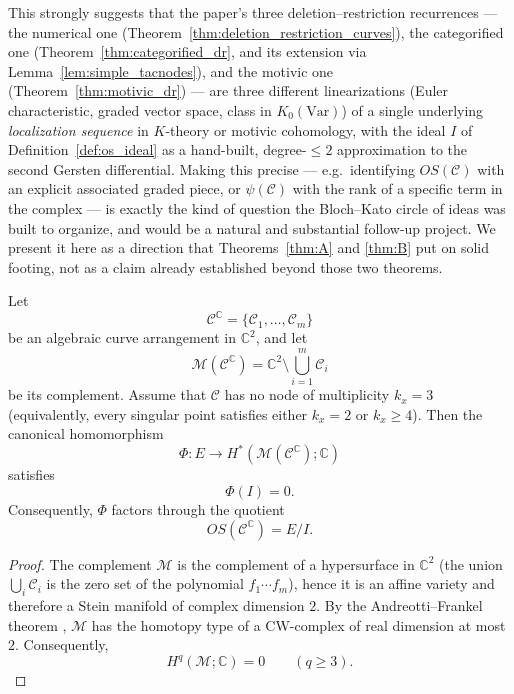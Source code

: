 \documentclass[article,11pt]{amsart} \numberwithin{equation}{section}
\numberwithin{equation}{section}
\begin{document}
{\begin{rk}
	This strongly suggests that the paper's three deletion--restriction
	recurrences --- the numerical one (Theorem~\ref{thm:deletion_restriction_curves}), the categorified one
	(Theorem~\ref{thm:categorified_dr}, and its extension via Lemma~\ref{lem:simple_tacnodes}), and the motivic one
	(Theorem~\ref{thm:motivic_dr}) --- are three different linearizations (Euler
	characteristic, graded vector space, class in $K_0(\mathrm{Var})$) of a
	single underlying \emph{localization sequence} in $K$-theory or motivic
	cohomology, with the ideal $I$ of Definition~\ref{def:os_ideal} as a hand-built,
	degree-$\le2$ approximation to the second Gersten differential. Making this
	precise --- e.g.\ identifying $OS(\mathcal C)$ with an explicit associated
	graded piece, or $\psi(\mathcal C)$ with the rank of a specific term in the
	complex --- is exactly the kind of question the Bloch--Kato circle of ideas
	was built to organize, and would be a natural and substantial follow-up
	project. We present it here as a direction that Theorems~\ref{thm:A} and
	\ref{thm:B} put on solid footing, not as a claim already established beyond
	those two theorems.
\end{rk}

\begin{thm}
	\label{thm:triple_obstruction}
	Let
	\[
	\mathcal C^{\mathbb C}
	=
	\{\mathscr C_1,\dots,\mathscr C_m\}
	\]
	be an algebraic curve arrangement in
	$\mathbb C^2$, and let
	\[
	\mathcal M(\mathcal C^{\mathbb C})
	=
	\mathbb C^2
	\setminus
	\bigcup_{i=1}^{m}\mathscr C_i
	\]
	be its complement.
	Assume that $\mathcal C$ has no node of multiplicity
	$k_x=3$
	(equivalently, every singular point satisfies either
	$k_x=2$
	or
	$k_x\ge4$).
	Then the canonical homomorphism
	\[
	\Phi:
	E
	\longrightarrow
	H^*(\mathcal M(\mathcal C^{\mathbb C});\mathbb C)
	\]
	satisfies
	\[
	\Phi(I)=0.
	\]
	Consequently, $\Phi$ factors through the quotient
	\[
	OS(\mathcal C^{\mathbb C})=E/I .
	\]
\end{thm}

\begin{proof}
	The complement
	$\mathcal M$
	is the complement of a hypersurface in
	$\mathbb C^2$
	(the union
	$\bigcup_i\mathscr C_i$
	is the zero set of the polynomial
	$f_1\cdots f_m$),
	hence it is an affine variety and therefore a Stein manifold of complex dimension $2$.
	By the Andreotti--Frankel theorem
	\cite{AndreottiFrankel59},
	$\mathcal M$
	has the homotopy type of a CW-complex of real dimension at most $2$.
	Consequently,
	\[
	H^q(\mathcal M;\mathbb C)=0
	\qquad
	(q\ge3).
	\]
	

\end{proof}}
\end{document}
